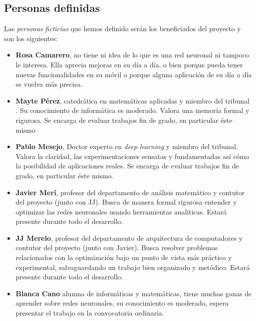 \subsection{Personas definidas}  \label{ch:metodología_personas}

Las \textit{personas ficticias} que hemos definido serán los beneficiados del proyecto 
y son los siguientes:  

\begin{itemize}

    \item \textbf{Rosa Camarero}, no tiene ni idea de lo que es una red neuronal ni tampoco le interesa.  Ella aprecia mejoras en su día a día, o bien porque pueda tener nuevas funcionalidades en su móvil o porque alguna 
    aplicación de su día a día se vuelva más precisa. 

    \item \textbf{Mayte Pérez}, catedrática en matemáticas aplicadas y miembro del tribunal . Su conocimiento
    de informática es moderado. Valora una memoria formal y rigurosa. Se encarga de evaluar trabajos fin de grado, en particular éste mismo
    
    \item \textbf{Pablo Mesejo}, Doctor experto en \textit{deep learning} y miembro del tribunal. Valora la claridad, las experimentaciones sensatas y fundamentadas así cómo la posibilidad de aplicaciones reales. Se encarga de evaluar trabajos fin de grado, en particular éste mismo. 
    
    \item \textbf{Javier Merí}, profesor del departamento de análisis matemático y contutor del proyecto (junto con JJ). Busca de manera formal rigurosa entender y optimizar las redes neuronales usando herramientas analíticas. Estará presente durante todo el desarrollo. 
    
    \item   \textbf{JJ Merelo}, profesor del departamento de arquitectura de computadores y contutor del proyecto (junto con Javier). 
    Busca resolver problemas relacionados con la optimización bajo un punto de vista más práctico y experimental, salvaguardando un trabajo bien organizado y metódico. Estará presente durante todo el desarrollo. 

    \item \textbf{Blanca Cano} alumna de informáticas y matemáticas, tiene muchas ganas de aprender sobre redes 
    neuronales, su conocimiento es moderado, espera presentar el trabajo en la convocatoria ordinaria. 

\end{itemize}

